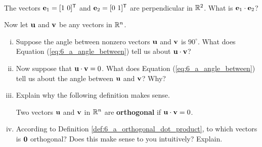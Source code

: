 \begin{activity} \label{act:6_a_orthogonality} ~ 
	\ba
	\item The vectors $\mathbf{e}_1 = [ 1 \ 0]^{\mathsf{T}}$ and $\mathbf{e}_2 = [0 \ 1]^{\mathsf{T}}$ are perpendicular in $\mathbb{R}^2$. What is $\mathbf{e}_1 \cdot \mathbf{e}_2$?
	
	
	
	\item Now let $\mathbf{u}$ and $\mathbf{v}$ be any vectors in $\mathbb{R}^n$. 
		\begin{enumerate}[i.]
		\item Suppose the angle between nonzero vectors $\mathbf{u}$ and $\mathbf{v}$ is $90^{\circ}$. What does Equation (\ref{eq:6_a_angle_between}) tell us about $\mathbf{u} \cdot \mathbf{v}$?
		
		
		
		\item Now suppose that $\mathbf{u} \cdot \mathbf{v} = 0$. What does Equation (\ref{eq:6_a_angle_between}) tell us about the angle between $\mathbf{u}$ and $\mathbf{v}$? Why?
		
		
		
		\item Explain why the following definition makes sense.


		
\begin{definition} \label{def:6_a_orthogonal_dot_product} Two vectors $\mathbf{u}$ and $\mathbf{v}$ in $\mathbb{R}^n$ are \textbf{orthogonal} if $\mathbf{u} \cdot \mathbf{v} = 0$.
\end{definition}



	\item According to Definition \ref{def:6_a_orthogonal_dot_product}, to which vectors is $\mathbf{0}$ orthogonal? Does this make sense to you intuitively? Explain. 
	
	
	
	\end{enumerate}
	
\ea

\end{activity}





